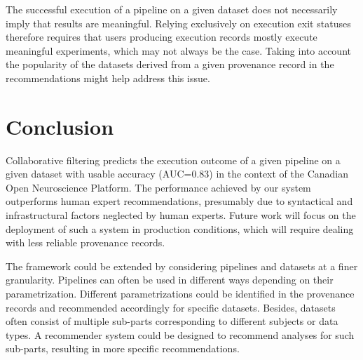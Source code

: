 The successful execution of a pipeline on a given dataset 
does not necessarily imply that results are meaningful. Relying exclusively 
on execution exit statuses therefore requires that users producing execution records mostly execute meaningful experiments, which may not always be the case. Taking into account the popularity of
the datasets derived from a given provenance record in the recommendations might help address this issue.




\section{Conclusion}

Collaborative filtering predicts the execution outcome of a given pipeline
on a given dataset with usable accuracy (AUC=0.83) in the context of the
Canadian Open Neuroscience Platform. The performance achieved by our system
outperforms
human expert recommendations, presumably due to syntactical and
infrastructural factors neglected by human experts. 
Future work will focus on the deployment of such a system in production conditions, which will require dealing with less reliable provenance records.



The framework could be extended by considering pipelines and datasets 
at a finer granularity. Pipelines can often be used in different ways 
depending on their parametrization. Different parametrizations could 
be identified in the provenance records and recommended accordingly 
for specific datasets. Besides, datasets often consist of multiple 
sub-parts corresponding to different subjects or data types. A recommender 
system could be designed to recommend analyses for such sub-parts, 
resulting in more specific recommendations.

